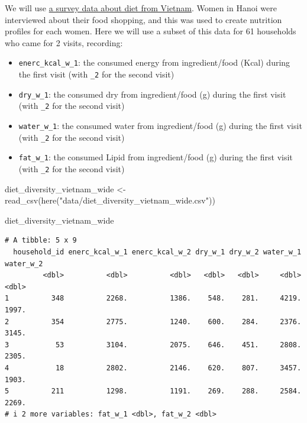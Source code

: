 \documentclass[
  letterpaper,
  DIV=11,
  numbers=noendperiod]{scrreprt}
\newenvironment{Shaded}{\begin{snugshade}}{\end{snugshade}}
\newcommand{\FunctionTok}[1]{\textcolor[rgb]{0.28,0.35,0.67}{#1}}
\newcommand{\NormalTok}[1]{\textcolor[rgb]{0.00,0.23,0.31}{#1}}
\newcommand{\OtherTok}[1]{\textcolor[rgb]{0.00,0.23,0.31}{#1}}
\newcommand{\StringTok}[1]{\textcolor[rgb]{0.13,0.47,0.30}{#1}}
\begin{document}
\begin{tcolorbox}[enhanced jigsaw, colframe=quarto-callout-tip-color-frame, rightrule=.15mm, opacityback=0, breakable, coltitle=black, colbacktitle=quarto-callout-tip-color!10!white, bottomrule=.15mm, leftrule=.75mm, toprule=.15mm, arc=.35mm, bottomtitle=1mm, colback=white, left=2mm, opacitybacktitle=0.6, titlerule=0mm, title=\textcolor{quarto-callout-tip-color}{\faLightbulb}\hspace{0.5em}{Practice}, toptitle=1mm]

We will use
\href{https://www.wur.nl/en/project/Retail-Diversity-for-Dietary-Diversity-RD4DD.htm}{a
survey data about diet from Vietnam}. Women in Hanoi were interviewed
about their food shopping, and this was used to create nutrition
profiles for each women. Here we will use a subset of this data for 61
households who came for 2 visits, recording:

\begin{itemize}
\item
  \texttt{enerc\_kcal\_w\_1}: the consumed energy from ingredient/food
  (Kcal) during the first visit (with \texttt{\_2} for the second visit)
\item
  \texttt{dry\_w\_1}: the consumed dry from ingredient/food (g) during
  the first visit (with \texttt{\_2} for the second visit)
\item
  \texttt{water\_w\_1}: the consumed water from ingredient/food (g)
  during the first visit (with \texttt{\_2} for the second visit)
\item
  \texttt{fat\_w\_1}: the consumed Lipid from ingredient/food (g) during
  the first visit (with \texttt{\_2} for the second visit)
\end{itemize}

\begin{Shaded}
\begin{Highlighting}[]
\NormalTok{diet\_diversity\_vietnam\_wide }\OtherTok{\textless{}{-}} \FunctionTok{read\_csv}\NormalTok{(}\FunctionTok{here}\NormalTok{(}\StringTok{"data/diet\_diversity\_vietnam\_wide.csv"}\NormalTok{))}

\NormalTok{diet\_diversity\_vietnam\_wide}
\end{Highlighting}
\end{Shaded}

\begin{verbatim}
# A tibble: 5 x 9
  household_id enerc_kcal_w_1 enerc_kcal_w_2 dry_w_1 dry_w_2 water_w_1 water_w_2
         <dbl>          <dbl>          <dbl>   <dbl>   <dbl>     <dbl>     <dbl>
1          348          2268.          1386.    548.    281.     4219.     1997.
2          354          2775.          1240.    600.    284.     2376.     3145.
3           53          3104.          2075.    646.    451.     2808.     2305.
4           18          2802.          2146.    620.    807.     3457.     1903.
5          211          1298.          1191.    269.    288.     2584.     2269.
# i 2 more variables: fat_w_1 <dbl>, fat_w_2 <dbl>
\end{verbatim}


\end{tcolorbox}
\end{document}
